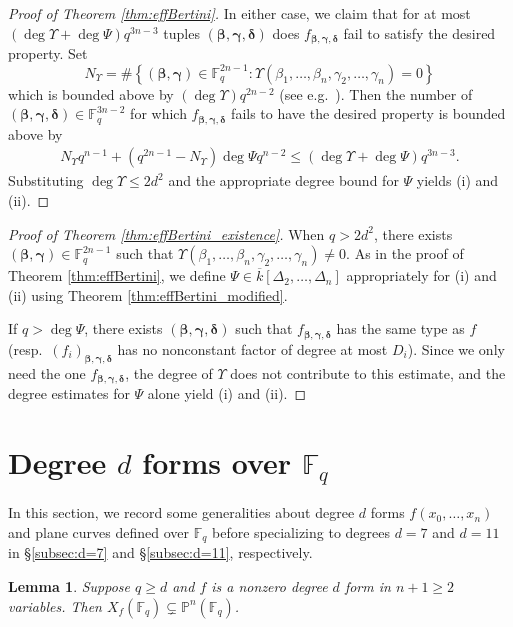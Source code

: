 \documentclass{amsart}
\newcommand{\F}{\mathbb{F}}
\renewcommand{\P}{\mathbb{P}}
\renewcommand{\v}{\beta}
\newcommand{\w}{\gamma}
\newcommand{\z}{\delta}
\newcommand{\zvar}{\Delta}
\newcommand{\bv}{\boldsymbol{\v}}
\newcommand{\bw}{\boldsymbol{\w}}
\newcommand{\bz}{\boldsymbol{\z}}
\newcommand{\fvwz}{f_{\bv, \bw, \bz}}
\newtheorem{lemma}[theorem]{Lemma}
\theoremstyle{definition}
\numberwithin{equation}{section}
\numberwithin{table}{section}
\newcommand{\qbound}[1]{{\color{cyan}$q > {#1}$}}
\newcommand{\qboundgeq}[1]{{\color{cyan}$q \geq {#1}$}}
\renewcommand{\qbound}[1]{{$q > {#1}$}}
\renewcommand{\qboundgeq}[1]{{$q \geq {#1}$}}
\begin{document}
\begin{proof}[Proof of Theorem \ref{thm:effBertini}]
In either case, we claim that for at most $(\deg \Upsilon + \deg \Psi)q^{3n-3}$ tuples $(\bv,\bw,\bz)$ does $\fvwz$ fail to satisfy the desired property. Set
	\[N_\Upsilon = \# \left\{ (\bv,\bw) \in \F_q^{2n-1} : \Upsilon(\v_1,\ldots,\v_n,\w_2,\ldots,\w_n) = 0 \right\}\]
	which is bounded above by $(\deg \Upsilon)q^{2n-2}$ (see e.g.\ \cite[Lemma 2.1]{CafureMatera}).
	Then the number of $(\bv,\bw,\bz) \in \F_q^{3n-2}$ for which $\fvwz$ fails to have the desired property is bounded above by
	\begin{align*} 
		N_\Upsilon q^{n-1} + (q^{2n-1} - N_\Upsilon) \deg \Psi q^{n-2}
		\leq \left(\deg \Upsilon + \deg \Psi\right)q^{3n-3}.
	\end{align*}
	Substituting $\deg \Upsilon \leq 2d^2$ and the appropriate degree bound for $\Psi$ yields (i) and (ii).
\end{proof}

\begin{proof}[Proof of Theorem \ref{thm:effBertini_existence}]
	When \qbound{2d^2}, there exists $(\bv,\bw) \in \F_q^{2n-1}$ such that $\Upsilon(\v_1,\ldots,\v_n,\w_2,\ldots,\w_n) \neq 0$. As in the proof of Theorem \ref{thm:effBertini}, we define $\Psi \in \overline{k}[\zvar_2,\ldots,\zvar_n]$ appropriately for (i) and (ii) using Theorem \ref{thm:effBertini_modified}. 
	
	If $q > \deg \Psi$, there exists $(\bv,\bw,\bz)$ such that $\fvwz$ has the same type as $f$ (resp.\ $(f_i)_{\bv,\bw,\bz}$ has no nonconstant factor of degree at most $D_i$). Since we only need the one $\fvwz$, the degree of $\Upsilon$ does not contribute to this estimate, and the degree estimates for $\Psi$ alone yield (i) and (ii).
\end{proof}

\section{Degree \texorpdfstring{$d$}{d} forms over \texorpdfstring{$\F_q$}{Fq}}
\label{sec:facts_degreed_Fq}

In this section, we record some generalities about degree $d$ forms $f(x_0,\ldots,x_n)$  and plane curves defined over $\F_q$ before specializing to degrees $d=7$ and $d=11$ in \S \ref{subsec:d=7} and \S \ref{subsec:d=11}, respectively.

\begin{lemma}
\label{lem:all_pts_vanish}
	Suppose \qboundgeq{d} and $f$ is a nonzero degree $d$ form in $n+1 \geq 2$ variables. Then $X_f(\F_q) \subsetneq \P^n(\F_q)$.
\end{lemma}
\end{document}
